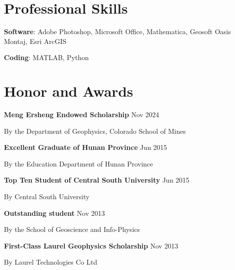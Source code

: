 \documentclass[paper=a4,fontsize=11pt]{scrartcl} %
\newcommand{\sepspace}{\vspace*{0.5em}}		%
\newcommand{\NewPart}[1]{\section*{{#1}}}
\begin{document}
\NewPart{Professional Skills}{}
\hspace{2em} \textbf{Software}: Adobe Photoshop, Microsoft Office, Mathematica, Geosoft Oasis Montaj, Esri ArcGIS

\hspace{0em} \textbf{Coding}: MATLAB, Python
\sepspace



    
\NewPart{Honor and Awards}{}
\hspace{2em} \textbf{Meng Ersheng Endowed Scholarship } \hspace{23em} Nov 2024

\hspace{0em} By the Department of Geophysics, Colorado School of Mines

\hspace{0em} \textbf{Excellent Graduate of Hunan Province} \hspace{22.7em} Jun 2015

\hspace{0em} By the Education Department of Hunan Province

\hspace{0em} \textbf{Top Ten Student of Central South University} \hspace{19.9em} Jun 2015

\hspace{0em} By Central South University

\hspace{0em} \textbf{Outstanding student} \hspace{30.4em} Nov 2013

\hspace{0em} By the School of Geoscience and Info-Physics

\hspace{0em} \textbf{First-Class Laurel Geophysics Scholarship} \hspace{20.6em} Nov 2013

\hspace{0em} By Laurel Technologies Co Ltd
\end{document}
